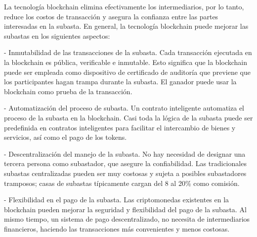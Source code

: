 
  La tecnología blockchain elimina efectivamente los intermediarios, por lo tanto, reduce los costos de 
  transacción y asegura la confianza entre las partes interesadas en la subasta. En general, la tecnología
  blockchain puede mejorar las subastas en los siguientes aspectos:
  
  - Inmutabilidad de las transacciones de la subasta. Cada transacción ejecutada en la blockchain es pública, verificable e inmutable.
  Esto significa que la blockchain puede ser empleada como dispositivo de certificado de auditoría que previene que los participantes
  hagan trampa durante la subasta. El ganador puede usar la blockchain como prueba de la transacción.
  
  - Automatización del proceso de subasta. Un contrato inteligente automatiza el proceso de la subasta en la blockchain. Casi toda 
  la lógica de la subasta puede ser predefinida en contratos inteligentes para facilitar el intercambio de bienes y servicios, así como
  el pago de los tokens.

  - Descentralización del manejo de la subasta. No hay necesidad de designar una tercera persona como subastador, que asegure la 
  confiabilidad. Las tradicionales subastas centralizadas pueden ser muy costosas y sujeta a posibles subastadores tramposos; casas
  de subastas típicamente cargan del 8 al 20\% como comisión. 

  - Flexibilidad en el pago de la subasta. Las criptomonedas existentes en la blockchain pueden mejorar la seguridad y flexibilidad
  del pago de la subasta. Al mismo tiempo, un sistema de pago descentralizado, no necesita de intermediarios financieros, haciendo
  las transacciones más convenientes y menos costosas. \parencite{shi2021} %

